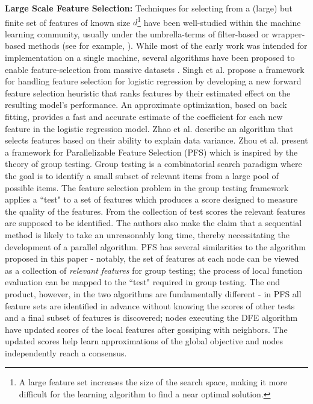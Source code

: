 \noindent \textbf{Large Scale Feature Selection: }Techniques for selecting
from a (large) but finite set of features of known size $d$\footnote{A large feature set increases
the size of the search space, making it more difficult for the
learning algorithm to find a near optimal solution.}
have been well-studied within the machine learning community, usually under
the umbrella-terms of filter-based or wrapper-based methods
(see for example, \cite{John_94,Liu_98}). 
While most of the early work was intended for implementation on a single
machine, several algorithms have been proposed to enable feature-selection from massive datasets \cite{Garcia_06,Lopez_06,Sun_14}. Singh et al. \cite{SinghKLS09} propose a framework for handling feature selection for logistic regression by developing a new forward feature selection heuristic that ranks features by their estimated effect on the resulting model's performance. An approximate optimization, based on back fitting, provides a fast and accurate estimate of the coefficient for each new feature in the logistic regression model. Zhao et al. \cite{ZhaoCDS12} describe an algorithm that selects features based on their ability to explain data variance. Zhou et al. \cite{Zhou_14} present a framework for Parallelizable Feature Selection (PFS) which is inspired by the theory of group testing. Group testing is a combinatorial search paradigm where the goal is to identify a small subset of relevant items from a large pool of possible items. The feature selection problem in the group testing framework applies a ``test" to a set of features which produces
a score designed to measure the quality of the features. From the collection of test scores the relevant features are supposed to
be identified. The authors also make the claim that a sequential method is likely to take an unreasonably long time, thereby necessitating the development of a parallel algorithm.  PFS has several similarities to the algorithm proposed in this paper - notably, the set of features at each node can be viewed as a collection of \emph{relevant features} for group testing; the process of local function evaluation can be mapped to the ``test" required in group testing. The end product, however, in the two algorithms are fundamentally different - in PFS all feature sets are identified in advance without knowing the scores of other tests and a final subset of features is discovered; nodes executing the DFE algorithm have updated scores of the local features after gossiping with neighbors. The updated scores help learn approximations of the global objective and nodes independently reach a consensus.  

